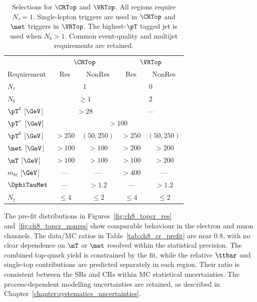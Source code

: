 \begin{table}[htbp]
    \centering
    \small
    \caption{Selections for $\CRTop$ and $\VRTop$. All regions require $N_\tau=1$. Single-lepton triggers are used in $\CRTop$ and $\met$ triggers in $\VRTop$. The highest-$\pT$ tagged jet is used when $N_b>1$. Common event-quality and multijet requirements are retained.}
    \label{tab:ch8_top_regions}
    \begin{tabular}{lcccc}
        \toprule
         & \multicolumn{2}{c}{$\CRTop$} & \multicolumn{2}{c}{$\VRTop$} \\
        Requirement & Res & NonRes & Res & NonRes \\
        \midrule
        $N_\ell$ & \multicolumn{2}{c}{1} & \multicolumn{2}{c}{0} \\
        $N_b$ & \multicolumn{2}{c}{$\geq1$} & \multicolumn{2}{c}{2} \\
        $\pT^\ell$ [$\GeV$] & \multicolumn{2}{c}{$>28$} & \multicolumn{2}{c}{---} \\
        $\pT^\tau$ [$\GeV$] & \multicolumn{4}{c}{$>100$} \\
        $\pT^b$ [$\GeV$] & $>250$ & $(50,250)$ & $>250$ & $(50,250)$ \\
        $\met$ [$\GeV$] & $>100$ & $>100$ & $>200$ & $>200$ \\
        $\mT$ [$\GeV$] & $>100$ & $>100$ & $>100$ & $>200$ \\
        $m_{b\tau}$ [$\GeV$] & --- & --- & $>400$ & --- \\
        $\DphiTauMet$ & --- & $>1.2$ & --- & $>1.2$ \\
        $N_j$ & $\leq4$ & $\leq2$ & $\leq4$ & $\leq2$ \\
        \bottomrule
    \end{tabular}
\end{table}

The pre-fit distributions in Figures~\ref{fig:ch8_topcr_res} and~\ref{fig:ch8_topcr_nonres} show comparable behaviour in the electron and muon channels.
The data/MC ratios in Table~\ref{tab:ch8_cr_prefit} are near 0.8, with no clear dependence on $\mT$ or $\met$ resolved within the statistical precision.
The combined top-quark yield is constrained by the fit, while the relative $\ttbar$ and single-top contributions are predicted separately in each region.
Their ratio is consistent between the SRs and CRs within MC statistical uncertainties.
The process-dependent modelling uncertainties are retained, as described in Chapter~\ref{chapter:systematics_uncertainties}.

